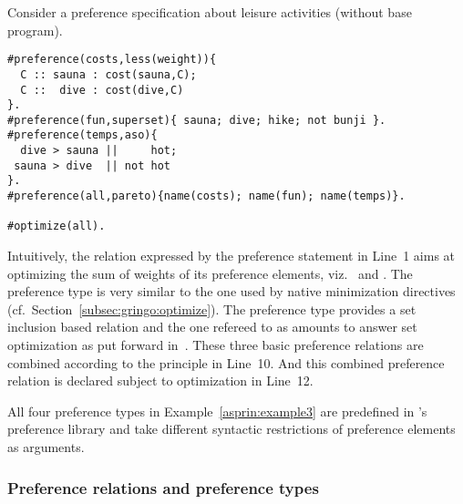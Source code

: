 \begin{example}\label{asprin:example3}
Consider a preference specification about leisure activities (without base program).
\begin{lstlisting}[escapechar=?]
#preference(costs,less(weight)){ 
  C :: sauna : cost(sauna,C); 
  C ::  dive : cost(dive,C) 
}.
#preference(fun,superset){ sauna; dive; hike; not bunji }.
#preference(temps,aso){
  dive > sauna ||     hot; 
 sauna > dive  || not hot
}.
#preference(all,pareto){name(costs); name(fun); name(temps)}.

#optimize(all).
\end{lstlisting}
Intuitively, the relation expressed by the preference statement  in Line~1 aims at optimizing the sum of weights of its preference elements, 
viz.\  and .
The preference type  is very similar to the one used by native minimization directives (cf.\ Section~\ref{subsec:gringo:optimize}).
The preference type  provides a set inclusion based relation and the one refereed to as 
amounts to answer set optimization as put forward in~\cite{brnitr03a}.
These three basic preference relations are combined according to the  principle in Line~10.
And this combined preference relation is declared subject to optimization in Line~12.
\end{example}
%
\begin{note}
All four preference types in Example~\ref{asprin:example3} are predefined in \asprin's preference library and take different syntactic restrictions of preference elements as arguments.  
\end{note}


\subsubsection{Preference relations and preference types}


